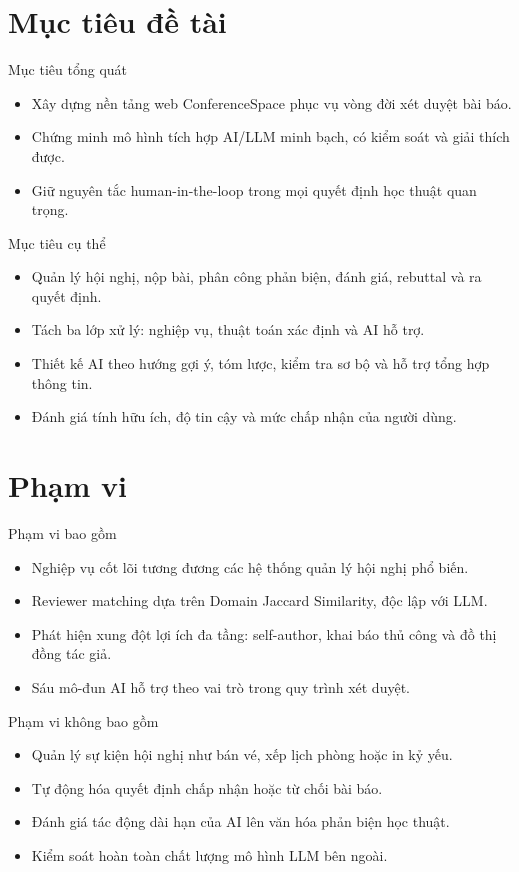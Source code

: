 \documentclass[aspectratio=169]{beamer}
\begin{document}
\section{Mục tiêu đề tài}
\begin{frame}{Mục tiêu tổng quát}
\begin{itemize}
\item Xây dựng nền tảng web ConferenceSpace phục vụ vòng đời xét duyệt bài báo.
\item Chứng minh mô hình tích hợp AI/LLM minh bạch, có kiểm soát và giải thích được.
\item Giữ nguyên tắc human-in-the-loop trong mọi quyết định học thuật quan trọng.
\end{itemize}
\end{frame}
\begin{frame}{Mục tiêu cụ thể}
\begin{itemize}
\item Quản lý hội nghị, nộp bài, phân công phản biện, đánh giá, rebuttal và ra quyết định.
\item Tách ba lớp xử lý: nghiệp vụ, thuật toán xác định và AI hỗ trợ.
\item Thiết kế AI theo hướng gợi ý, tóm lược, kiểm tra sơ bộ và hỗ trợ tổng hợp thông tin.
\item Đánh giá tính hữu ích, độ tin cậy và mức chấp nhận của người dùng.
\end{itemize}
\end{frame}
\section{Phạm vi}
\begin{frame}{Phạm vi bao gồm}
\begin{itemize}
\item Nghiệp vụ cốt lõi tương đương các hệ thống quản lý hội nghị phổ biến.
\item Reviewer matching dựa trên Domain Jaccard Similarity, độc lập với LLM.
\item Phát hiện xung đột lợi ích đa tầng: self-author, khai báo thủ công và đồ thị đồng tác giả.
\item Sáu mô-đun AI hỗ trợ theo vai trò trong quy trình xét duyệt.
\end{itemize}
\end{frame}
\begin{frame}{Phạm vi không bao gồm}
\begin{itemize}
\item Quản lý sự kiện hội nghị như bán vé, xếp lịch phòng hoặc in kỷ yếu.
\item Tự động hóa quyết định chấp nhận hoặc từ chối bài báo.
\item Đánh giá tác động dài hạn của AI lên văn hóa phản biện học thuật.
\item Kiểm soát hoàn toàn chất lượng mô hình LLM bên ngoài.
\end{itemize}
\end{frame}
\end{document}
